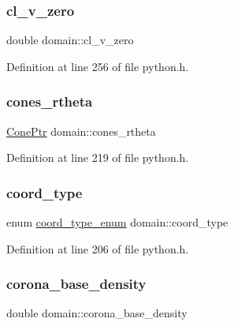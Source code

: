 \subsubsection{\texorpdfstring{cl\+\_\+v\+\_\+zero}{cl\_v\_zero}}
{\footnotesize\ttfamily double domain\+::cl\+\_\+v\+\_\+zero}



Definition at line 256 of file python.\+h.

\mbox{\label{structdomain_a9691a01ac9495ef917b1537b00110210}} 
\subsubsection{\texorpdfstring{cones\+\_\+rtheta}{cones\_rtheta}}
{\footnotesize\ttfamily \hyperlink{python_8h_a24207bf0bce7d09eb68cd114e725996d}{Cone\+Ptr} domain\+::cones\+\_\+rtheta}



Definition at line 219 of file python.\+h.

\mbox{\label{structdomain_acbaa6a69b41c9e7c924b668baa65bad3}} 
\subsubsection{\texorpdfstring{coord\+\_\+type}{coord\_type}}
{\footnotesize\ttfamily enum \hyperlink{python_8h_a0a67e9069ac2a2910ddc33cb34df0566}{coord\+\_\+type\+\_\+enum} domain\+::coord\+\_\+type}



Definition at line 206 of file python.\+h.

\mbox{\label{structdomain_a921857c057550470b8a5251e40470660}} 
\subsubsection{\texorpdfstring{corona\+\_\+base\+\_\+density}{corona\_base\_density}}
{\footnotesize\ttfamily double domain\+::corona\+\_\+base\+\_\+density}



